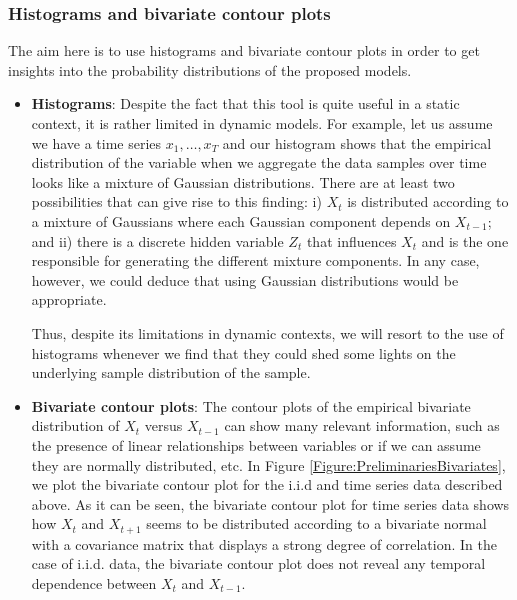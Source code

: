 \subsubsection{Histograms and bivariate contour plots}

The aim here is to use histograms and bivariate contour plots in order to get insights into the probability distributions of the proposed models. 

\begin{itemize}
\item \textbf{Histograms}: Despite the fact that this tool is quite useful in a static context, it is rather limited in dynamic models. For example, let us assume we have a time series $x_1,\ldots, x_T$ and our histogram shows that the empirical distribution of the variable when we aggregate the data samples over time looks like a mixture of Gaussian distributions. There are at least two possibilities that can give rise to this finding: 
i) $X_t$ is distributed according to a mixture of Gaussians where each Gaussian component depends on $X_{t-1}$; and ii) there is a discrete hidden variable $Z_t$ that influences $X_{t}$ and is the one responsible for generating the different mixture components. In any case, however, we could deduce that using Gaussian distributions would be appropriate.

Thus, despite its limitations in dynamic contexts, we will resort to the use of histograms whenever we find that they could shed some lights on the underlying sample distribution of the sample.

\item \textbf{Bivariate contour plots}: The contour plots of the empirical bivariate distribution of $X_t$ versus $X_{t-1}$ can show many relevant information, such as the presence of linear relationships between variables or if we can assume they are normally distributed, etc. In Figure \ref{Figure:PreliminariesBivariates}, we plot the bivariate contour plot for the i.i.d and time series data described above. As it can be seen, the bivariate contour plot for time series data shows how $X_t$ and $X_{t+1}$ seems to be distributed according to a bivariate normal with a covariance matrix that displays a strong degree of correlation. In the case of i.i.d. data, the bivariate contour plot does not reveal any temporal dependence between $X_t$ and $X_{t-1}$. 


\end{itemize}
